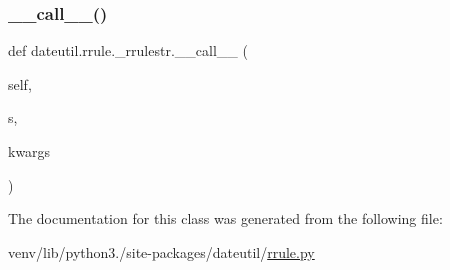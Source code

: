 \subsubsection{\texorpdfstring{\+\_\+\+\_\+call\+\_\+\+\_\+()}{\_\_call\_\_()}}
{\footnotesize\ttfamily def dateutil.\+rrule.\+\_\+rrulestr.\+\_\+\+\_\+call\+\_\+\+\_\+ (\begin{DoxyParamCaption}\item[{}]{self,  }\item[{}]{s,  }\item[{}]{kwargs }\end{DoxyParamCaption})}



The documentation for this class was generated from the following file\+:\begin{DoxyCompactItemize}
\item 
venv/lib/python3./site-\/packages/dateutil/\hyperlink{rrule_8py}{rrule.\+py}\end{DoxyCompactItemize}
